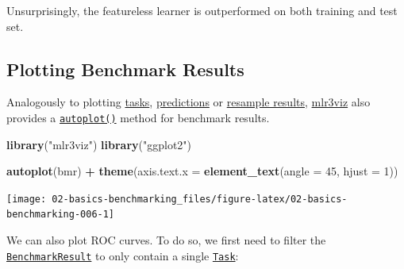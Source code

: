 \documentclass[]{scrbook}
\newenvironment{Shaded}{\begin{snugshade}}{\end{snugshade}}
\newcommand{\DataTypeTok}[1]{\textcolor[rgb]{0.13,0.29,0.53}{#1}}
\newcommand{\DecValTok}[1]{\textcolor[rgb]{0.00,0.00,0.81}{#1}}
\newcommand{\KeywordTok}[1]{\textcolor[rgb]{0.13,0.29,0.53}{\textbf{#1}}}
\newcommand{\NormalTok}[1]{#1}
\newcommand{\OperatorTok}[1]{\textcolor[rgb]{0.81,0.36,0.00}{\textbf{#1}}}
\newcommand{\StringTok}[1]{\textcolor[rgb]{0.31,0.60,0.02}{#1}}
\renewenvironment{Shaded} {\begin{snugshade}\small} {\end{snugshade}}
\begin{document}
Unsurprisingly, the featureless learner is outperformed on both training and test set.

\hypertarget{autoplot-benchmarkresult}{%
\subsection{Plotting Benchmark Results}\label{autoplot-benchmarkresult}}

Analogously to plotting \protect\hyperlink{autoplot-task}{tasks}, \protect\hyperlink{autoplot-prediction}{predictions} or \protect\hyperlink{autoplot-resampleresult}{resample results}, \href{https://mlr3viz.mlr-org.com}{mlr3viz} also provides a \href{https://www.rdocumentation.org/packages/ggplot2/topics/autoplot}{\texttt{autoplot()}} method for benchmark results.

\begin{Shaded}
\begin{Highlighting}[]
\KeywordTok{library}\NormalTok{(}\StringTok{"mlr3viz"}\NormalTok{)}
\KeywordTok{library}\NormalTok{(}\StringTok{"ggplot2"}\NormalTok{)}

\KeywordTok{autoplot}\NormalTok{(bmr) }\OperatorTok{+}\StringTok{ }\KeywordTok{theme}\NormalTok{(}\DataTypeTok{axis.text.x =} \KeywordTok{element_text}\NormalTok{(}\DataTypeTok{angle =} \DecValTok{45}\NormalTok{, }\DataTypeTok{hjust =} \DecValTok{1}\NormalTok{))}
\end{Highlighting}
\end{Shaded}

\begin{center}\texttt{[image: 02-basics-benchmarking\_files/figure-latex/02-basics-benchmarking-006-1]} \end{center}

We can also plot ROC curves.
To do so, we first need to filter the \href{https://mlr3.mlr-org.com/reference/BenchmarkResult.html}{\texttt{BenchmarkResult}} to only contain a single \href{https://mlr3.mlr-org.com/reference/Task.html}{\texttt{Task}}:

\begin{Shaded}
\end{Shaded}
\end{document}
